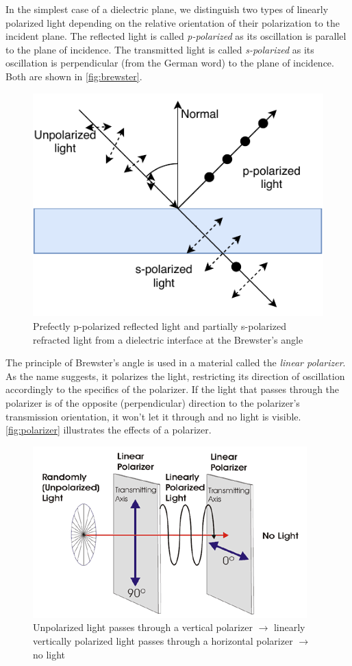 In the simplest case of a dielectric plane, we distinguish two types of linearly polarized light depending on the relative orientation of their polarization to the incident plane. The reflected light is called \emph{p-polarized} as its oscillation is parallel to the plane of incidence. The transmitted light is called \emph{s-polarized} as its oscillation is perpendicular (from the German word) to the plane of incidence. Both are shown in \autoref{fig:brewster}.

\begin{figure}[h]
	\centering
	\includegraphics[width=.7\linewidth]{img/brewster.pdf}
	\caption{Prefectly p-polarized reflected light and partially s-polarized refracted light from a dielectric interface at the Brewster's angle}
	\label{fig:brewster}
\end{figure}


The principle of Brewster's angle is used in a material called the \emph{linear polarizer}. As the name suggests, it polarizes the light, restricting its direction of oscillation accordingly to the specifics of the polarizer. If the light that passes through the polarizer is of the opposite (perpendicular) direction to the polarizer's transmission orientation, it won't let it through and no light is visible. \autoref{fig:polarizer} illustrates the effects of a polarizer.

\begin{figure}[h]
	\centering
	\includegraphics[width=.6\linewidth]{img/polarizer.png}
	\caption[nikon]{Unpolarized light passes through a vertical polarizer $\rightarrow$ linearly vertically polarized light passes through a horizontal polarizer $\rightarrow$ no light\footnotemark}
	\label{fig:polarizer}
\end{figure}

